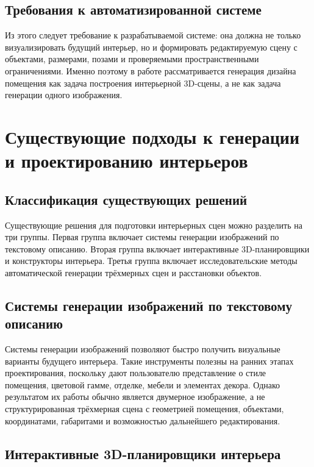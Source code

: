 \documentclass[times]{itmo-student-thesis}
\begin{document}
\subsection{Требования к автоматизированной системе}

Из этого следует требование к разрабатываемой системе: она должна не только визуализировать будущий интерьер, но и формировать редактируемую сцену с объектами, размерами, позами и проверяемыми пространственными ограничениями. Именно поэтому в работе рассматривается генерация дизайна помещения как задача построения интерьерной 3D-сцены, а не как задача генерации одного изображения.

\section{Существующие подходы к генерации и проектированию интерьеров}

\subsection{Классификация существующих решений}

Существующие решения для подготовки интерьерных сцен можно разделить на три группы. Первая группа включает системы генерации изображений по текстовому описанию. Вторая группа включает интерактивные 3D-планировщики и конструкторы интерьера. Третья группа включает исследовательские методы автоматической генерации трёхмерных сцен и расстановки объектов.

\subsection{Системы генерации изображений по текстовому описанию}

Системы генерации изображений позволяют быстро получить визуальные варианты будущего интерьера. Такие инструменты полезны на ранних этапах проектирования, поскольку дают пользователю представление о стиле помещения, цветовой гамме, отделке, мебели и элементах декора. Однако результатом их работы обычно является двумерное изображение, а не структурированная трёхмерная сцена с геометрией помещения, объектами, координатами, габаритами и возможностью дальнейшего редактирования.

\subsection{Интерактивные 3D-планировщики интерьера}
\end{document}
